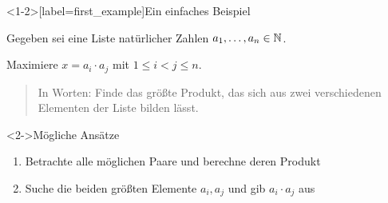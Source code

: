 \begin{frame}<1-2>[label=first_example]{Ein einfaches Beispiel}
\begin{example}
Gegeben sei eine Liste natürlicher Zahlen $a_1, \dots, a_n \in \mathbb{N}$.

Maximiere $x = a_i \cdot a_j$ mit $1 \leq i < j \leq n$.

\begin{quote}
    In Worten: Finde das \alert{gr\"o{\ss}te} Produkt, das sich aus zwei \alert{verschiedenen} Elementen der Liste bilden lässt.
\end{quote}

\begin{block}<2->{M\"ogliche Ans\"atze}
    \begin{enumerate}
        \item Betrachte alle möglichen Paare und berechne deren Produkt
        \pause
        \item<4-> Suche die beiden gr\"o{\ss}ten Elemente $a_i, a_j$ und gib $a_i \cdot a_j$ aus
    \end{enumerate}
\end{block}
\end{example}
\end{frame}

